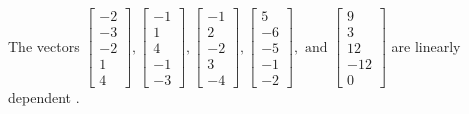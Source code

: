 \begin{exercise}
\begin{exerciseStatement}
  \end{exerciseStatement}
  \begin{exerciseAnswer}
   The vectors \(\left[\begin{array}{r}
-2 \\
-3 \\
-2 \\
1 \\
4
\end{array}\right] , \left[\begin{array}{r}
-1 \\
1 \\
4 \\
-1 \\
-3
\end{array}\right] , \left[\begin{array}{r}
-1 \\
2 \\
-2 \\
3 \\
-4
\end{array}\right] , \left[\begin{array}{r}
5 \\
-6 \\
-5 \\
-1 \\
-2
\end{array}\right] , \text{ and } \left[\begin{array}{r}
9 \\
3 \\
12 \\
-12 \\
0
\end{array}\right]\) are 
  	 linearly dependent  .
  


  \end{exerciseAnswer}
\end{exercise}